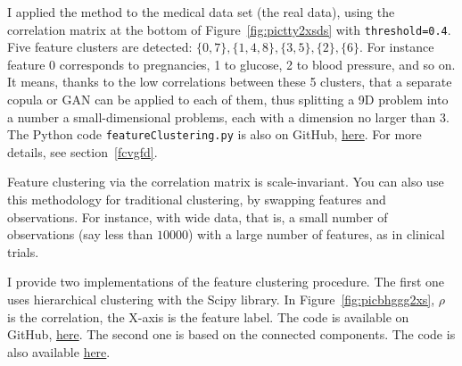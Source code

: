 \documentclass[oneside,10pt]{book}
\begin{document}
I applied the method to the medical data set (the real data), using the correlation matrix at the bottom
 of Figure~\ref{fig:pictty2xsds} with \texttt{threshold=0.4}. Five feature clusters are
 detected: $\{0, 7\}, \{1, 4, 8\}, \{3, 5\}, \{2\}, \{6\}$. For instance feature 0 corresponds to pregnancies, 1 to glucose, 2 to blood pressure, and so on. It means, thanks to the low correlations between these 5 clusters, that a separate copula or GAN can be applied to each of them, thus splitting a 9D problem into a number a small-dimensional problems, each with a dimension no larger than 3. The Python code
\texttt{featureClustering.py} is also
 on GitHub, \href{https://github.com/VincentGranville/Main/blob/main/featureClustering.py}{here}. For more details, see section~\ref{fcvgfd}.

Feature clustering via the correlation matrix is scale-invariant. You can also use this methodology for traditional clustering, by swapping features and observations. For instance, with
\textcolor{index}{wide data}, that is, a small number of observations (say less than $\num{10000}$) with a large number of features, as in clinical trials.

I provide two implementations of the feature clustering procedure. The first one uses
\textcolor{index}{hierarchical clustering} with the Scipy library. In
 Figure~\ref{fig:picbhggg2xs}, $\rho$ is the correlation, the X-axis is the feature label. The code is available on GitHub,
 \href{https://github.com/VincentGranville/Main/blob/main/featureClusteringScipy.py}{here}. The second one is based on the connected components. The code
 is also available \href{https://github.com/VincentGranville/Main/blob/main/featureClustering.py}{here}. \vspace{1ex}
\end{document}
